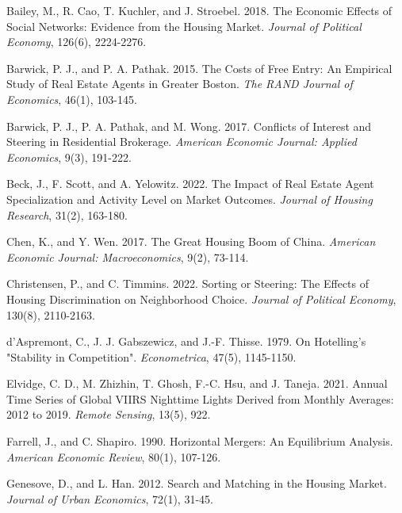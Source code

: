 \documentclass[11pt]{article}
\begin{document}
\begin{singlespace}
\begin{thebibliography}{}
Bailey, M., R. Cao, T. Kuchler, and J. Stroebel. 2018. The Economic Effects of Social Networks: Evidence from the Housing Market. \textit{Journal of Political Economy}, 126(6), 2224-2276. 

Barwick, P. J., and P. A. Pathak. 2015. The Costs of Free Entry: An Empirical Study of Real Estate Agents in Greater Boston. \textit{The RAND Journal of Economics}, 46(1), 103-145. 

Barwick, P. J., P. A. Pathak, and M. Wong. 2017. Conflicts of Interest and Steering in Residential Brokerage. \textit{American Economic Journal: Applied Economics}, 9(3), 191-222. 

Beck, J., F. Scott, and A. Yelowitz. 2022. The Impact of Real Estate Agent Specialization and Activity Level on Market Outcomes. \textit{Journal of Housing Research}, 31(2), 163-180. 

Chen, K., and Y. Wen. 2017. The Great Housing Boom of China. \textit{American Economic Journal: Macroeconomics}, 9(2), 73-114. 

Christensen, P., and C. Timmins. 2022. Sorting or Steering: The Effects of Housing Discrimination on Neighborhood Choice. \textit{Journal of Political Economy}, 130(8), 2110-2163. 

d'Aspremont, C., J. J. Gabszewicz, and J.-F. Thisse. 1979. On Hotelling’s "Stability in Competition". \textit{Econometrica}, 47(5), 1145-1150. 

Elvidge, C. D., M. Zhizhin, T. Ghosh, F.-C. Hsu, and J. Taneja. 2021. Annual Time Series of Global VIIRS Nighttime Lights Derived from Monthly Averages: 2012 to 2019. \textit{Remote Sensing}, 13(5), 922. 

Farrell, J., and C. Shapiro. 1990. Horizontal Mergers: An Equilibrium Analysis. \textit{American Economic Review}, 80(1), 107-126. 

Genesove, D., and L. Han. 2012. Search and Matching in the Housing Market. \textit{Journal of Urban Economics}, 72(1), 31-45. 


\end{thebibliography}
\end{singlespace}
\end{document}
